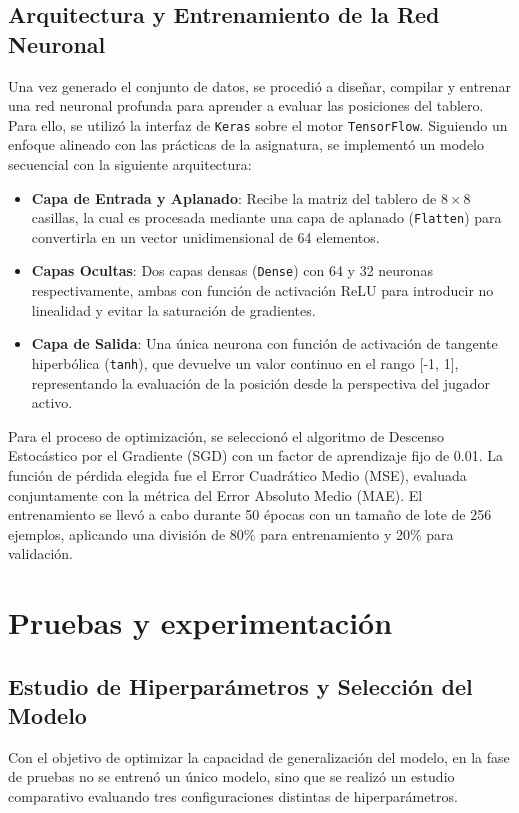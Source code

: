 \documentclass[conference]{IEEEtran}
\begin{document}
\subsection{Arquitectura y Entrenamiento de la Red Neuronal}
Una vez generado el conjunto de datos, se procedió a diseñar, compilar y entrenar una red neuronal profunda para aprender a evaluar las posiciones del tablero. Para ello, se utilizó la
interfaz de \texttt{Keras} sobre el motor \texttt{TensorFlow}. Siguiendo un enfoque alineado con las prácticas de la asignatura, se implementó un modelo secuencial con la siguiente arquitectura:
\begin{itemize}
    \item \textbf{Capa de Entrada y Aplanado}: Recibe la matriz del tablero de $8 \times 8$ casillas, la cual es procesada mediante una capa de aplanado (\texttt{Flatten}) para 
    convertirla en un vector unidimensional de 64 elementos.
    \item \textbf{Capas Ocultas}: Dos capas densas (\texttt{Dense}) con 64 y 32 neuronas respectivamente, ambas con función de activación ReLU para introducir no linealidad
    y evitar la saturación de gradientes.
    \item \textbf{Capa de Salida}: Una única neurona con función de activación de tangente hiperbólica (\texttt{tanh}), que devuelve un valor continuo en el rango [-1, 1], 
    representando la evaluación de la posición desde la perspectiva del jugador activo.
\end{itemize}

Para el proceso de optimización, se seleccionó el algoritmo de Descenso Estocástico por el Gradiente (SGD) con un factor de aprendizaje fijo de 0.01. La función de pérdida elegida fue
el Error Cuadrático Medio (MSE), evaluada conjuntamente con la métrica del Error Absoluto Medio (MAE). El entrenamiento se llevó a cabo durante 50 épocas con un tamaño de lote de 256 ejemplos, 
aplicando una división de 80\% para entrenamiento y 20\% para validación. 


\section{Pruebas y experimentación}
\subsection{Estudio de Hiperparámetros y Selección del Modelo}
Con el objetivo de optimizar la capacidad de generalización del modelo, en la fase de pruebas no se entrenó un único modelo, sino que se realizó un estudio comparativo evaluando
tres configuraciones distintas de hiperparámetros. 
\end{document}
